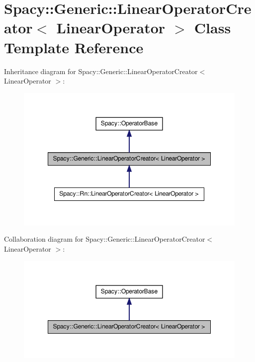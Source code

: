\hypertarget{classSpacy_1_1Generic_1_1LinearOperatorCreator}{\section{\-Spacy\-:\-:\-Generic\-:\-:\-Linear\-Operator\-Creator$<$ \-Linear\-Operator $>$ \-Class \-Template \-Reference}
\label{classSpacy_1_1Generic_1_1LinearOperatorCreator}
}


\-Inheritance diagram for \-Spacy\-:\-:\-Generic\-:\-:\-Linear\-Operator\-Creator$<$ \-Linear\-Operator $>$\-:
\nopagebreak
\begin{figure}[H]
\begin{center}
\leavevmode
\includegraphics[width=348pt]{classSpacy_1_1Generic_1_1LinearOperatorCreator__inherit__graph}
\end{center}
\end{figure}


\-Collaboration diagram for \-Spacy\-:\-:\-Generic\-:\-:\-Linear\-Operator\-Creator$<$ \-Linear\-Operator $>$\-:
\nopagebreak
\begin{figure}[H]
\begin{center}
\leavevmode
\includegraphics[width=348pt]{classSpacy_1_1Generic_1_1LinearOperatorCreator__coll__graph}
\end{center}
\end{figure}
